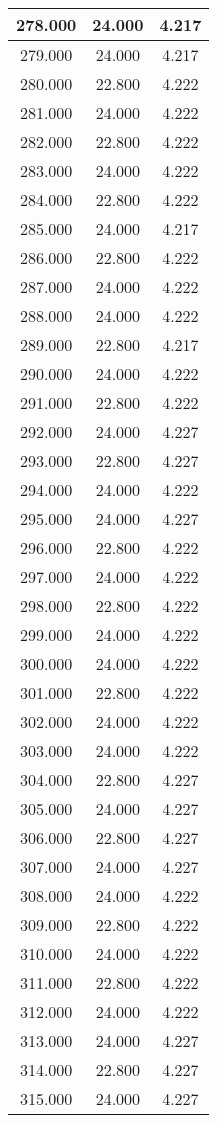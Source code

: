 \begin{longtable}[c]{|c|c|c|}
278.000	&24.000&4.217  \\ \hline 	
279.000	&24.000&4.217  \\ \hline 	
280.000	&22.800&4.222  \\ \hline 	
281.000	&24.000&4.222  \\ \hline 	
282.000	&22.800&4.222  \\ \hline 	
283.000	&24.000&4.222  \\ \hline 	
284.000	&22.800&4.222  \\ \hline 	
285.000	&24.000&4.217  \\ \hline 	
286.000	&22.800&4.222  \\ \hline 	
287.000	&24.000&4.222  \\ \hline 	
288.000	&24.000&4.222  \\ \hline 	
289.000	&22.800&4.217  \\ \hline 	
290.000	&24.000&4.222  \\ \hline 	
291.000	&22.800&4.222  \\ \hline 	
292.000	&24.000&4.227  \\ \hline 	
293.000	&22.800&4.227  \\ \hline 	
294.000	&24.000&4.222  \\ \hline 	
295.000	&24.000&4.227  \\ \hline 	
296.000	&22.800&4.222  \\ \hline 	
297.000	&24.000&4.222  \\ \hline 	
298.000	&22.800&4.222  \\ \hline 	
299.000	&24.000&4.222  \\ \hline 	
300.000	&24.000&4.222  \\ \hline 	
301.000	&22.800&4.222  \\ \hline 	
302.000	&24.000&4.222  \\ \hline 	
303.000	&24.000&4.222  \\ \hline 	
304.000	&22.800&4.227  \\ \hline 	
305.000	&24.000&4.227  \\ \hline 	
306.000	&22.800&4.227  \\ \hline 	
307.000	&24.000&4.227  \\ \hline 	
308.000	&24.000&4.222  \\ \hline 	
309.000	&22.800&4.222  \\ \hline 	
310.000	&24.000&4.222  \\ \hline 	
311.000	&22.800&4.222  \\ \hline 	
312.000	&24.000&4.222  \\ \hline 	
313.000	&24.000&4.227  \\ \hline 	
314.000	&22.800&4.227  \\ \hline 	
315.000	&24.000&4.227  \\ \hline
\end{longtable} 	
